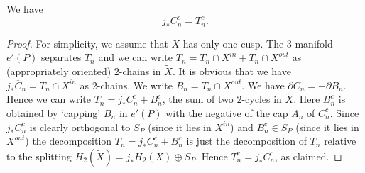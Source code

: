 \begin{proposition}\label{CnTn}
We have
\[
j_{\ast} C_n^c = T_n^c.
\]
\end{proposition}

\begin{proof}
For simplicity, we assume that $X$ has only one cusp. The $3$-manifold $e'(P)$ separates $T_n$
and  we can write $T_n = T_n \cap X^{in} + T_n \cap X^{out}$ as (appropriately oriented)  $2$-chains  in $\tilde{X}$. It is obvious that we have $j_{\ast} \overline{C}_n = T_n \cap X^{in}$ as $2$-chains. We write $B_n = T_n \cap X^{out}$. We have $\partial C_n = - \partial B_n$. Hence we can write $T_n = j_{\ast} C_n^c + B_n^c$, the sum of two  $2$-cycles in $\tilde{X}$. Here $B_n^c$ is obtained by `capping' $B_n$ in $e'(P)$ with the negative of the cap $A_n$ of $C_n^c$. 
Since  $j_*C_n^c$  is clearly orthogonal to $S_P$ (since it lies in $X^{in}$) and $B_n^c \in
S_P$ (since it lies in $X^{out}$)
the decomposition $T_n = j_*C_n^c + B_n^c$ is just the decomposition of
$T_n$ relative to the splitting $H_2(\tilde{X}) = j_*H_2(X)  \oplus S_P$.
Hence $T_n^c =  j_*C_n^c$, as claimed.
\end{proof}

